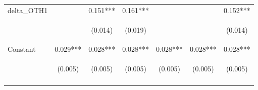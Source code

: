 \begin{center}
\begin{tabular}{lcccccc}
delta\_OTH1 &  & 0.151*** & 0.161*** &  &  & 0.152*** \\
\vspace{4pt} & \begin{footnotesize}\end{footnotesize} & \begin{footnotesize}(0.014)\end{footnotesize} & \begin{footnotesize}(0.019)\end{footnotesize} & \begin{footnotesize}\end{footnotesize} & \begin{footnotesize}\end{footnotesize} & \begin{footnotesize}(0.014)\end{footnotesize} \\
Constant & 0.029*** & 0.028*** & 0.028*** & 0.028*** & 0.028*** & 0.028*** \\
 & \begin{footnotesize}(0.005)\end{footnotesize} & \begin{footnotesize}(0.005)\end{footnotesize} & \begin{footnotesize}(0.005)\end{footnotesize} & \begin{footnotesize}(0.005)\end{footnotesize} & \begin{footnotesize}(0.005)\end{footnotesize} & \begin{footnotesize}(0.005)\end{footnotesize} \\
\vspace{4pt} & \begin{footnotesize}\end{footnotesize} & \begin{footnotesize}\end{footnotesize} & \begin{footnotesize}\end{footnotesize} & \begin{footnotesize}\end{footnotesize} & \begin{footnotesize}\end{footnotesize} & \begin{footnotesize}\end{footnotesize} \\

\end{tabular}
\end{center}
